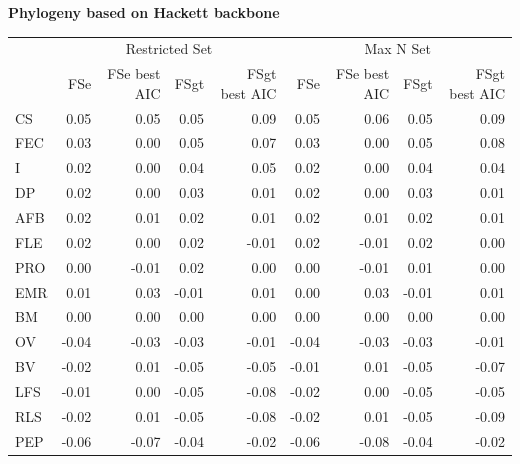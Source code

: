 \begin{table}
\begin{footnotesize}
\textbf{Phylogeny based on Hackett backbone}

\begin{tabular}{@{}l|rrrr|rrrr@{}}
\toprule
  & \multicolumn{4}{c|}{Restricted Set} & \multicolumn{4}{c}{Max N Set}\\
  & FSe & FSe best AIC & FSgt & FSgt best AIC & FSe & FSe best AIC & FSgt & FSgt best AIC\\
\midrule
CS & 0.05 & 0.05 & 0.05 & 0.09 & 0.05 & 0.06 & 0.05 & 0.09\\
FEC & 0.03 & 0.00 & 0.05 & 0.07 & 0.03 & 0.00 & 0.05 & 0.08\\
I & 0.02 & 0.00 & 0.04 & 0.05 & 0.02 & 0.00 & 0.04 & 0.04\\
DP & 0.02 & 0.00 & 0.03 & 0.01 & 0.02 & 0.00 & 0.03 & 0.01\\
AFB & 0.02 & 0.01 & 0.02 & 0.01 & 0.02 & 0.01 & 0.02 & 0.01\\
FLE & 0.02 & 0.00 & 0.02 & -0.01 & 0.02 & -0.01 & 0.02 & 0.00\\
PRO & 0.00 & -0.01 & 0.02 & 0.00 & 0.00 & -0.01 & 0.01 & 0.00\\
EMR & 0.01 & 0.03 & -0.01 & 0.01 & 0.00 & 0.03 & -0.01 & 0.01\\
BM & 0.00 & 0.00 & 0.00 & 0.00 & 0.00 & 0.00 & 0.00 & 0.00\\
OV & -0.04 & -0.03 & -0.03 & -0.01 & -0.04 & -0.03 & -0.03 & -0.01\\
BV & -0.02 & 0.01 & -0.05 & -0.05 & -0.01 & 0.01 & -0.05 & -0.07\\
LFS & -0.01 & 0.00 & -0.05 & -0.08 & -0.02 & 0.00 & -0.05 & -0.05\\
RLS & -0.02 & 0.01 & -0.05 & -0.08 & -0.02 & 0.01 & -0.05 & -0.09\\
PEP & -0.06 & -0.07 & -0.04 & -0.02 & -0.06 & -0.08 & -0.04 & -0.02\\
\bottomrule
\end{tabular}

\end{footnotesize}
\end{table}

